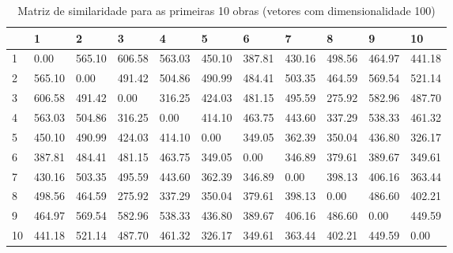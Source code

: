 \documentclass{article}
\begin{document}
\begin{table}[h]
  \begin{center}
    \tiny
    \begin{tabular}{| l | l | l | l | l | l | l | l | l | l | l |}
    \hline
 & 1 & 2 & 3 & 4 & 5 & 6 & 7 & 8 & 9 & 10 \\
    \hline
1 & 0.00 & 565.10 & 606.58 & 563.03 & 450.10 & 387.81 & 430.16 & 498.56 & 464.97 & 441.18 \\
2 & 565.10 & 0.00 & 491.42 & 504.86 & 490.99 & 484.41 & 503.35 & 464.59 & 569.54 & 521.14 \\
3 & 606.58 & 491.42 & 0.00 & 316.25 & 424.03 & 481.15 & 495.59 & 275.92 & 582.96 & 487.70 \\
4 & 563.03 & 504.86 & 316.25 & 0.00 & 414.10 & 463.75 & 443.60 & 337.29 & 538.33 & 461.32 \\
5 & 450.10 & 490.99 & 424.03 & 414.10 & 0.00 & 349.05 & 362.39 & 350.04 & 436.80 & 326.17 \\
6 & 387.81 & 484.41 & 481.15 & 463.75 & 349.05 & 0.00 & 346.89 & 379.61 & 389.67 & 349.61 \\
7 & 430.16 & 503.35 & 495.59 & 443.60 & 362.39 & 346.89 & 0.00 & 398.13 & 406.16 & 363.44 \\
8 & 498.56 & 464.59 & 275.92 & 337.29 & 350.04 & 379.61 & 398.13 & 0.00 & 486.60 & 402.21 \\
9 & 464.97 & 569.54 & 582.96 & 538.33 & 436.80 & 389.67 & 406.16 & 486.60 & 0.00 & 449.59 \\
10 & 441.18 & 521.14 & 487.70 & 461.32 & 326.17 & 349.61 & 363.44 & 402.21 & 449.59 & 0.00 \\
    \hline
    \end{tabular}
    \caption{Matriz de similaridade para as primeiras 10 obras (vetores com dimensionalidade 100)} 
    \label{tab:matrix_100}
  \end{center}
\end{table}
\end{document}
